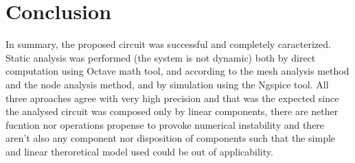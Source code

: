 \section{Conclusion}
\label{sec:conclusion}

In summary, the proposed circuit was successful and completely caracterized. Static analysis was performed (the system is not dynamic) both by direct computation using Octave math tool, and according to the mesh analysis method and the node analysis method, and by simulation using the Ngspice tool. All three aproaches agree with very high precision and that was the expected since the analysed circuit was composed only by linear components, there are nether fucntion nor operations propense to provoke numerical instability and there aren't also any component nor disposition of components such that the simple and linear theroretical model used could be out of applicability.

